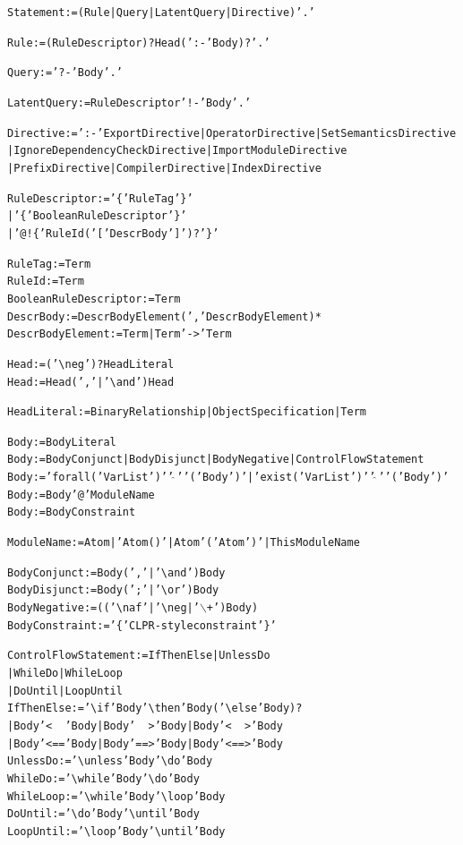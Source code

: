 \documentclass[11pt]{article}
\newcommand{\ERGO}{\mbox{\smaller{\ensuremath{\cal{E}}\smaller{{\sc{RGO}}}}}\xspace}
\newcommand{\bs}{\textbackslash}
\newcommand{\RULELOGNAF}{{\texttt{{\bs}naf}}\xspace}
\newcommand{\RULELOGNEG}{{\texttt{{\bs}neg}}\xspace}
\begin{document}
{\small
\begin{alltt}

Statement := (Rule | Query | LatentQuery | Directive) '.'

Rule := (RuleDescriptor)? Head (':-' Body)? '.'

Query := '?-' Body '.'

LatentQuery := RuleDescriptor '!-' Body '.'

Directive := ':-' ExportDirective | OperatorDirective | SetSemanticsDirective
	             | IgnoreDependencyCheckDirective | ImportModuleDirective
                     | PrefixDirective | CompilerDirective | IndexDirective

RuleDescriptor := '\@\{' RuleTag '\}'
                  | '\@\@\{' BooleanRuleDescriptor '\}'
                  | '@!\{' RuleId ( '[' DescrBody ']' )? '\}'

RuleTag := Term
RuleId := Term
BooleanRuleDescriptor := Term
DescrBody := DescrBodyElement (',' DescrBodyElement)*
DescrBodyElement := Term | Term '->' Term

Head := ('\RULELOGNEG')? HeadLiteral
Head := Head (',' | '\bs{}and') Head

HeadLiteral := BinaryRelationship | ObjectSpecification | Term

Body := BodyLiteral
Body := BodyConjunct | BodyDisjunct | BodyNegative | ControlFlowStatement
Body := 'forall(' VarList ')' '\ensuremath{\widehat{\ }}' '(' Body ')' | 'exist(' VarList ')' '\ensuremath{\widehat{\ }}' '(' Body ')'
Body := Body '@' ModuleName
Body := BodyConstraint

ModuleName := Atom | 'Atom()' | Atom '(' Atom ')' | ThisModuleName

BodyConjunct := Body (',' | '\bs{}and') Body
BodyDisjunct := Body (';' | '\bs{}or') Body
BodyNegative := (('\RULELOGNAF' | '\RULELOGNEG | '\ensuremath{\backslash}+') Body)
BodyConstraint := '\{' CLPR-style constraint '\}'

ControlFlowStatement  := IfThenElse | UnlessDo
                          | WhileDo | WhileLoop
                          | DoUntil | LoopUntil
IfThenElse := '\bs{}if' Body '\bs{}then' Body  ('\bs{}else' Body)?
                | Body '<~~' Body | Body '~~>' Body | Body '<~~>' Body
                | Body '<==' Body | Body '==>' Body | Body '<==>' Body
UnlessDo   := '\bs{}unless' Body '\bs{}do' Body
WhileDo    := '\bs{}while' Body '\bs{}do' Body
WhileLoop  := '\bs{}while' Body '\bs{}loop' Body
DoUntil    := '\bs{}do' Body '\bs{}until' Body
LoopUntil  := '\bs{}loop' Body '\bs{}until' Body


\end{alltt}}
\end{document}
